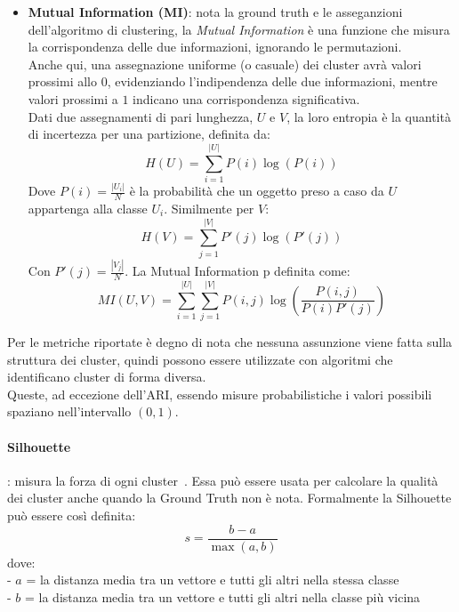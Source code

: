 \begin{itemize}
\item \textbf{Mutual Information (MI)}: nota la ground truth e le asseganzioni dell'algoritmo di clustering, la \textit{Mutual Information} è una funzione che misura la corrispondenza delle due informazioni, ignorando le permutazioni. 
\\
Anche qui, una assegnazione uniforme (o casuale) dei cluster avrà valori prossimi allo $0$, evidenziando l'indipendenza delle due informazioni, mentre valori prossimi a $1$ indicano una corrispondenza significativa.
\\
Dati due assegnamenti di pari lunghezza, $U$ e $V$, la loro entropia è la quantità di incertezza per una partizione, definita da:
\begin{equation}
H(U) = \sum\limits_{i=1}^{|U|} P(i)\log (P(i))
\end{equation}
Dove $P(i) = \frac{|U_i|}{N}$ è la probabilità che un oggetto preso a caso da $U$ appartenga alla classe $U_i$. Similmente per $V$:
\begin{equation}
H(V) = \sum\limits_{j=1}^{|V|} P'(j)\log (P'(j))
\end{equation}
Con $P'(j) = \frac{|V_j|}{N}$. La Mutual Information p definita come:
\begin{equation}
MI(U,V) = \sum\limits_{i=1}^{|U|}\sum\limits_{j=1}^{|V|} P(i,j)\log \left( \frac{P(i,j)}{P(i)P'(j)} \right)
\end{equation}

\end{itemize}

Per le metriche riportate è degno di nota che nessuna assunzione viene fatta sulla struttura dei cluster, quindi possono essere utilizzate con algoritmi che identificano cluster di forma diversa.
\\
Queste, ad eccezione dell'ARI, essendo misure probabilistiche i valori possibili spaziano nell'intervallo $(0,1)$. 


\paragraph{Silhouette}: misura la forza di ogni cluster~\cite{Rousseeuw87}. Essa può essere usata per calcolare la qualità dei cluster anche quando la Ground Truth non è nota.
Formalmente la Silhouette può essere così definita:
\begin{equation}
s = \frac{b - a}{\max (a,b)}
\end{equation}
dove:
\\
- $a$ = la distanza media tra un vettore e tutti gli altri nella stessa classe
\\
- $b$ = la distanza media tra un vettore e tutti gli altri nella classe più vicina

